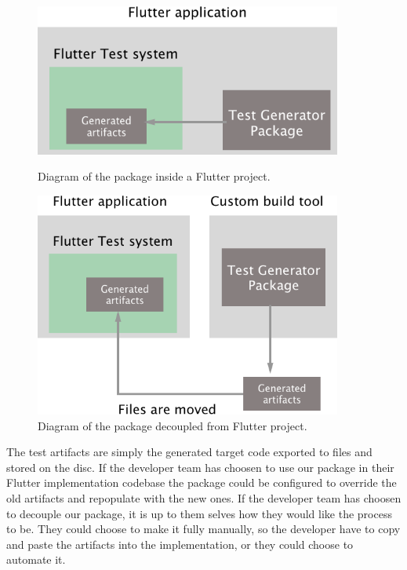 \begin{figure}[H]
    \centering
    \begin{minipage}{0.45\textwidth}
        \centering
        \includegraphics[width=0.9\textwidth]{images/Embedded-in-flutter.png}
        \caption{Diagram of the package inside a Flutter project.}
        \label{package_in_futter}
    \end{minipage}\hfill
    \begin{minipage}{0.45\textwidth}
        \centering
        \includegraphics[width=0.9\textwidth]{images/Decoupled-from-flutter.png}
        \caption{Diagram of the package decoupled from Flutter project.}
        \label{package_outside_flutter}
    \end{minipage}
\end{figure}

The test artifacts are simply the generated target code exported to files and stored on the disc. 
If the developer team has choosen to use our package in their Flutter implementation codebase the package could be configured to override the old artifacts and repopulate with the new ones.
If the developer team has choosen to decouple our package, it is up to them selves how they would like the process to be.
They could choose to make it fully manually, so the developer have to copy and paste the artifacts into the implementation, or they could choose to automate it.

